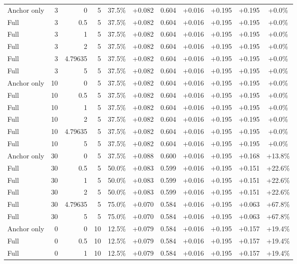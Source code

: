 \begin{table}[htbp]
\begin{tabular}{lrrrccccccc}
Anchor only & 3 & 0 & 5 & 37.5\% & +0.082 & 0.604 & +0.016 & +0.195 & +0.195 & +0.0\% \\
Full & 3 & 0.5 & 5 & 37.5\% & +0.082 & 0.604 & +0.016 & +0.195 & +0.195 & +0.0\% \\
Full & 3 & 1 & 5 & 37.5\% & +0.082 & 0.604 & +0.016 & +0.195 & +0.195 & +0.0\% \\
Full & 3 & 2 & 5 & 37.5\% & +0.082 & 0.604 & +0.016 & +0.195 & +0.195 & +0.0\% \\
Full & 3 & 4.79635 & 5 & 37.5\% & +0.082 & 0.604 & +0.016 & +0.195 & +0.195 & +0.0\% \\
Full & 3 & 5 & 5 & 37.5\% & +0.082 & 0.604 & +0.016 & +0.195 & +0.195 & +0.0\% \\
Anchor only & 10 & 0 & 5 & 37.5\% & +0.082 & 0.604 & +0.016 & +0.195 & +0.195 & +0.0\% \\
Full & 10 & 0.5 & 5 & 37.5\% & +0.082 & 0.604 & +0.016 & +0.195 & +0.195 & +0.0\% \\
Full & 10 & 1 & 5 & 37.5\% & +0.082 & 0.604 & +0.016 & +0.195 & +0.195 & +0.0\% \\
Full & 10 & 2 & 5 & 37.5\% & +0.082 & 0.604 & +0.016 & +0.195 & +0.195 & +0.0\% \\
Full & 10 & 4.79635 & 5 & 37.5\% & +0.082 & 0.604 & +0.016 & +0.195 & +0.195 & +0.0\% \\
Full & 10 & 5 & 5 & 37.5\% & +0.082 & 0.604 & +0.016 & +0.195 & +0.195 & +0.0\% \\
Anchor only & 30 & 0 & 5 & 37.5\% & +0.088 & 0.600 & +0.016 & +0.195 & +0.168 & +13.8\% \\
Full & 30 & 0.5 & 5 & 50.0\% & +0.083 & 0.599 & +0.016 & +0.195 & +0.151 & +22.6\% \\
Full & 30 & 1 & 5 & 50.0\% & +0.083 & 0.599 & +0.016 & +0.195 & +0.151 & +22.6\% \\
Full & 30 & 2 & 5 & 50.0\% & +0.083 & 0.599 & +0.016 & +0.195 & +0.151 & +22.6\% \\
Full & 30 & 4.79635 & 5 & 75.0\% & +0.070 & 0.584 & +0.016 & +0.195 & +0.063 & +67.8\% \\
Full & 30 & 5 & 5 & 75.0\% & +0.070 & 0.584 & +0.016 & +0.195 & +0.063 & +67.8\% \\
Anchor only & 0 & 0 & 10 & 12.5\% & +0.079 & 0.584 & +0.016 & +0.195 & +0.157 & +19.4\% \\
Full & 0 & 0.5 & 10 & 12.5\% & +0.079 & 0.584 & +0.016 & +0.195 & +0.157 & +19.4\% \\
Full & 0 & 1 & 10 & 12.5\% & +0.079 & 0.584 & +0.016 & +0.195 & +0.157 & +19.4\% \\

\end{tabular}
\end{table}
